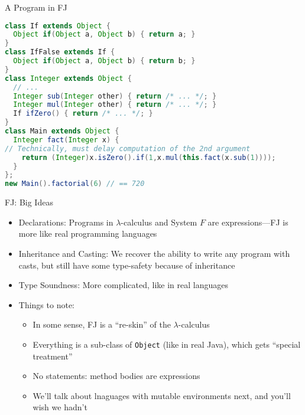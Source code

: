 \documentclass[leqno,presentation,usenames,dvipsnames]{beamer}
\begin{document}
\begin{frame}[fragile]{A Program in FJ}
\begin{lstlisting}[language=java, basicstyle=\scriptsize\ttfamily]
class If extends Object {
  Object if(Object a, Object b) { return a; }
}
class IfFalse extends If {
  Object if(Object a, Object b) { return b; }
}
class Integer extends Object {
  // ...
  Integer sub(Integer other) { return /* ... */; }
  Integer mul(Integer other) { return /* ... */; }
  If ifZero() { return /* ... */; }
}
class Main extends Object {
  Integer fact(Integer x) {
// Technically, must delay computation of the 2nd argument
    return (Integer)x.isZero().if(1,x.mul(this.fact(x.sub(1))));
  }
};
new Main().factorial(6) // == 720
\end{lstlisting}
\end{frame}

\begin{frame}[fragile]{FJ: Big Ideas}
    \begin{itemize}
        \item Declarations: Programs in $\lambda$-calculus and System $F$ are expressions---FJ is more like real programming languages
        \item Inheritance and Casting: We recover the ability to write any program with casts, but still have some type-safety because of inheritance
        \item Type Soundness: More complicated, like in real languages
        \item Things to note:
            \begin{itemize}
                \item In some sense, FJ is a ``re-skin'' of the $\lambda$-calculus
                \item Everything is a sub-class of \texttt{Object} (like in real Java), which gets ``special treatment''
                \item No statements: method bodies are expressions
                \item We'll talk about lnaguages with mutable environments next, and you'll wish we hadn't
            \end{itemize}
    \end{itemize}
\end{frame}
\end{document}
